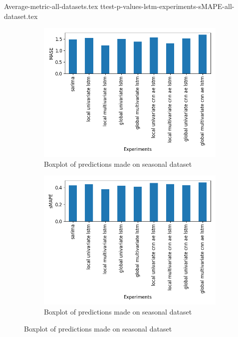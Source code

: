 {Average-metric-all-datasets.tex}
{ttest-p-values-lstm-experiments-sMAPE-all-dataset.tex}
\begin{figure}
  \begin{subfigure}[b]{0.49\textwidth}
    \includegraphics[width=\textwidth]{./figs/results/barplot/MASE-all-dataset.png}
    \hfill
    \caption{Boxplot of predictions made on seasonal dataset}
  \end{subfigure}
  \begin{subfigure}[b]{0.49\textwidth}
    \includegraphics[width=\textwidth]{./figs/results/barplot/sMAPE-all-dataset.png}
    \hfill
    \caption{Boxplot of predictions made on seasonal dataset}

  \end{subfigure}
\end{figure}

